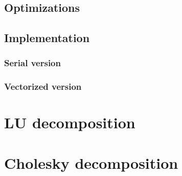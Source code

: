 \documentclass[]{scrartcl}
\begin{document}
\subsection{Optimizations}

\subsection{Implementation}
\subsubsection{Serial version}
\subsubsection{Vectorized version}

\section{LU decomposition}

\section{Cholesky decomposition}
\end{document}
